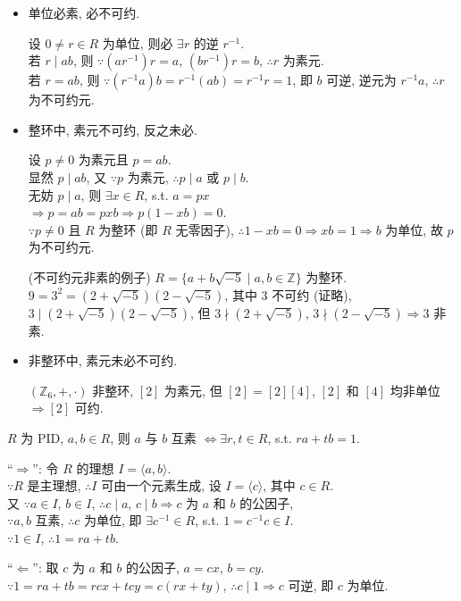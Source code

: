 \documentclass{note}
\begin{document}
\begin{itemize}
    \item 单位必素, 必不可约.
    \begin{pf}
        设 $0\neq r\in R$ 为单位, 则必 $\exists r$ 的逆 $r^{-1}$.\\
        若 $r\mid ab$, 则 $\because(ar^{-1})r=a$, $(br^{-1})r=b$, $\therefore r$ 为素元.\\
        若 $r=ab$, 则 $\because(r^{-1}a)b=r^{-1}(ab)=r^{-1}r=1$, 即 $b$ 可逆, 逆元为 $r^{-1}a$, $\therefore r$ 为不可约元.
    \end{pf}
    \item 整环中, 素元不可约, 反之未必.
    \begin{pf}
        设 $p\neq 0$ 为素元且 $p=ab$.\\
        显然 $p\mid ab$, 又 $\because p$ 为素元, $\therefore p\mid a$ 或 $p\mid b$.\\
        无妨 $p\mid a$, 则 $\exists x\in R$, s.t. $a=px$\\
        $\Longrightarrow p=ab=pxb\Longrightarrow p(1-xb)=0$.\\
        $\because p\neq 0$ 且 $R$ 为整环 (即 $R$ 无零因子), $\therefore 1-xb=0\Longrightarrow xb=1\Longrightarrow b$ 为单位, 故 $p$ 为不可约元.
    \end{pf}
    \begin{eg}(不可约元非素的例子)
        $R=\{a+b\sqrt{-5}\mid a,b\in\mathbb{Z}\}$ 为整环.\\
        $9=3^2=(2+\sqrt{-5})(2-\sqrt{-5})$, 其中 $3$ 不可约 (证略), $3\mid(2+\sqrt{-5})(2-\sqrt{-5})$, 但 $3\nmid(2+\sqrt{-5})$, $3\nmid(2-\sqrt{-5})\Longrightarrow 3$ 非素.
    \end{eg}
    \item 非整环中, 素元未必不可约.
    \begin{eg}
        $(\mathbb{Z}_6,+,\cdot)$ 非整环, $[2]$ 为素元, 但 $[2]=[2][4]$, $[2]$ 和 $[4]$ 均非单位 $\Longrightarrow[2]$ 可约.
    \end{eg}
\end{itemize}

\begin{thm}[(课本定理 0.29)]
    $R$ 为 PID, $a,b\in R$, 则 $a$ 与 $b$ 互素 $\Longleftrightarrow\exists r,t\in R$, s.t. $ra+tb=1$.
\end{thm}
\begin{pf}
    ``$\Longrightarrow$'': 令 $R$ 的理想 $I=\langle a,b\rangle$.\\
    $\because R$ 是主理想, $\therefore I$ 可由一个元素生成, 设 $I=\langle c\rangle$, 其中 $c\in R$.\\
    又 $\because a\in I$, $b\in I$, $\therefore c\mid a$, $c\mid b\Longrightarrow c$ 为 $a$ 和 $b$ 的公因子,\\
    $\because a,b$ 互素, $\therefore c$ 为单位, 即 $\exists c^{-1}\in R$, s.t. $1=c^{-1}c\in I$.\\
    $\because 1\in I$, $\therefore 1=ra+tb$.

    ``$\Longleftarrow$'': 取 $c$ 为 $a$ 和 $b$ 的公因子, $a=cx$, $b=cy$.\\
    $\because 1=ra+tb=rcx+tcy=c(rx+ty)$, $\therefore c\mid 1\Longrightarrow c$ 可逆, 即 $c$ 为单位.
\end{pf}
\end{document}
